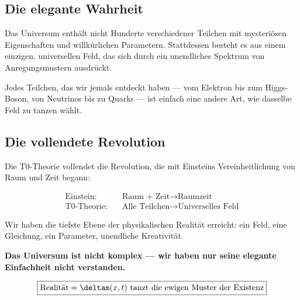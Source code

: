 	\subsection{Die elegante Wahrheit}
	
	Das Universum enthält nicht Hunderte verschiedener Teilchen mit mysteriösen Eigenschaften und willkürlichen Parametern. Stattdessen besteht es aus einem einzigen, universellen Feld, das sich durch ein unendliches Spektrum von Anregungsmustern ausdrückt.
	
	Jedes Teilchen, das wir jemals entdeckt haben --- vom Elektron bis zum Higgs-Boson, von Neutrinos bis zu Quarks --- ist einfach eine andere Art, wie dasselbe Feld zu tanzen wählt.
	
	\subsection{Die vollendete Revolution}
	
	Die T0-Theorie vollendet die Revolution, die mit Einsteins Vereinheitlichung von Raum und Zeit begann:
	
	\begin{align}
		\text{Einstein:} \quad &\text{Raum + Zeit} \rightarrow \text{Raumzeit} \\
		\text{T0-Theorie:} \quad &\text{Alle Teilchen} \rightarrow \text{Universelles Feld}
	\end{align}
	
	Wir haben die tiefste Ebene der physikalischen Realität erreicht: ein Feld, eine Gleichung, ein Parameter, unendliche Kreativität.
	
	\textbf{Das Universum ist nicht komplex --- wir haben nur seine elegante Einfachheit nicht verstanden.}
	
	\begin{equation}
		\boxed{\text{Realität} = \deltam(x,t) \text{ tanzt die ewigen Muster der Existenz}}
		\label{eq:final_truth}
	\end{equation}
	

